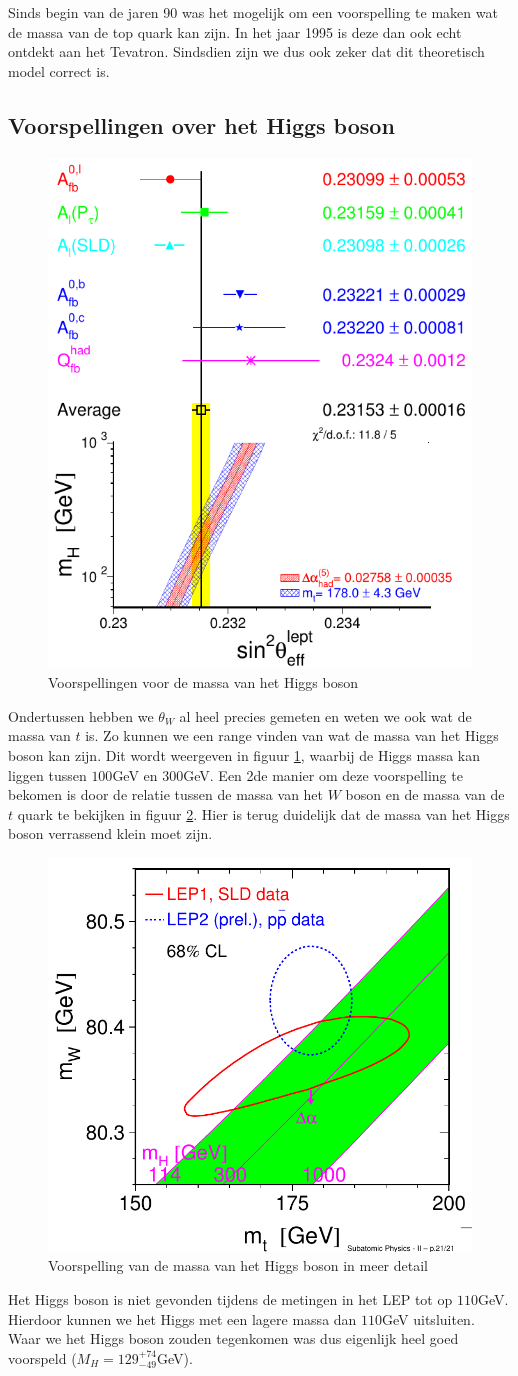 \documentclass[../main.tex]{subfiles}
\begin{document}
Sinds begin van de jaren 90 was het mogelijk om een voorspelling te maken wat de massa van de top quark kan zijn. In het jaar 1995 is deze dan ook echt ontdekt aan het Tevatron. Sindsdien zijn we dus ook zeker dat dit theoretisch model correct is.

\subsection{Voorspellingen over het Higgs boson}%
\label{sub:voorspellingen_over_het_higgs_boson}

\begin{figure}[h]
    \centering
    \includegraphics[width=0.5\linewidth]{elektroweak_precision_tests/h_massa_voorspelling.png}
    \caption{Voorspellingen voor de massa van het Higgs boson}%
    \label{fig:elektroweak_precision_tests/h_massa_voorspelling}
\end{figure}
Ondertussen hebben we $\theta_W$ al heel precies gemeten en weten we ook wat de massa van $t$ is. Zo kunnen we een range vinden van wat de massa van het Higgs boson kan zijn. Dit wordt weergeven in figuur \ref{fig:elektroweak_precision_tests/h_massa_voorspelling}, waarbij de Higgs massa kan liggen tussen $100$GeV en $300$GeV. Een 2de manier om deze voorspelling te bekomen is door de relatie tussen de massa van het $W$ boson en de massa van de $t$ quark te bekijken in figuur \ref{fig:elektroweak_precision_tests/h_massa_voorspelling_2}. Hier is terug duidelijk dat de massa van het Higgs boson verrassend klein moet zijn.

\begin{figure}[h]
    \centering
    \includegraphics[width=0.4\linewidth]{elektroweak_precision_tests/h_massa_voorspelling_2.png}
    \caption{Voorspelling van de massa van het Higgs boson in meer detail}%
    \label{fig:elektroweak_precision_tests/h_massa_voorspelling_2}
\end{figure}

Het Higgs boson is niet gevonden tijdens de metingen in het LEP tot op $110$GeV. Hierdoor kunnen we het Higgs met een lagere massa dan $110$GeV uitsluiten. Waar we het Higgs boson zouden tegenkomen was dus eigenlijk heel goed voorspeld ($M_H = 129_{-49}^{+74}$GeV).
\end{document}

